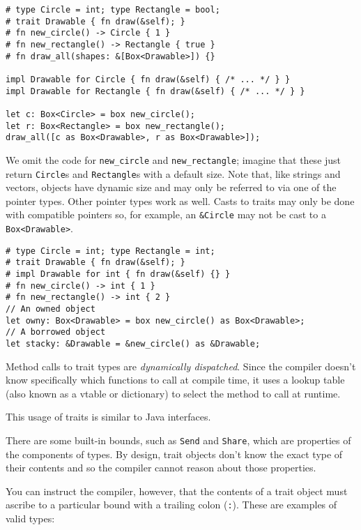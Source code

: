 \documentclass[]{article}
\begin{document}
\begin{verbatim}
# type Circle = int; type Rectangle = bool;
# trait Drawable { fn draw(&self); }
# fn new_circle() -> Circle { 1 }
# fn new_rectangle() -> Rectangle { true }
# fn draw_all(shapes: &[Box<Drawable>]) {}

impl Drawable for Circle { fn draw(&self) { /* ... */ } }
impl Drawable for Rectangle { fn draw(&self) { /* ... */ } }

let c: Box<Circle> = box new_circle();
let r: Box<Rectangle> = box new_rectangle();
draw_all([c as Box<Drawable>, r as Box<Drawable>]);
\end{verbatim}

We omit the code for \texttt{new\_circle} and \texttt{new\_rectangle};
imagine that these just return \texttt{Circle}s and \texttt{Rectangle}s
with a default size. Note that, like strings and vectors, objects have
dynamic size and may only be referred to via one of the pointer types.
Other pointer types work as well. Casts to traits may only be done with
compatible pointers so, for example, an \texttt{\&Circle} may not be
cast to a \texttt{Box\textless{}Drawable\textgreater{}}.

\begin{verbatim}
# type Circle = int; type Rectangle = int;
# trait Drawable { fn draw(&self); }
# impl Drawable for int { fn draw(&self) {} }
# fn new_circle() -> int { 1 }
# fn new_rectangle() -> int { 2 }
// An owned object
let owny: Box<Drawable> = box new_circle() as Box<Drawable>;
// A borrowed object
let stacky: &Drawable = &new_circle() as &Drawable;
\end{verbatim}

Method calls to trait types are \emph{dynamically dispatched}. Since the
compiler doesn't know specifically which functions to call at compile
time, it uses a lookup table (also known as a vtable or dictionary) to
select the method to call at runtime.

This usage of traits is similar to Java interfaces.

There are some built-in bounds, such as \texttt{Send} and
\texttt{Share}, which are properties of the components of types. By
design, trait objects don't know the exact type of their contents and so
the compiler cannot reason about those properties.

You can instruct the compiler, however, that the contents of a trait
object must ascribe to a particular bound with a trailing colon
(\texttt{:}). These are examples of valid types:
\end{document}
